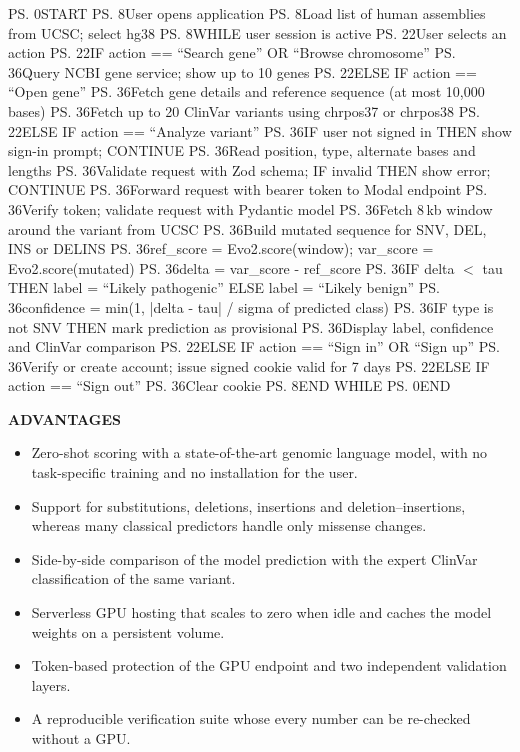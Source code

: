 \ps{0}{START}
\ps{8}{User opens application}
\ps{8}{Load list of human assemblies from UCSC; select hg38}
\ps{8}{WHILE user session is active}
\ps{22}{User selects an action}
\ps{22}{IF action == ``Search gene'' OR ``Browse chromosome''}
\ps{36}{Query NCBI gene service; show up to 10 genes}
\ps{22}{ELSE IF action == ``Open gene''}
\ps{36}{Fetch gene details and reference sequence (at most 10,000 bases)}
\ps{36}{Fetch up to 20 ClinVar variants using chrpos37 or chrpos38}
\ps{22}{ELSE IF action == ``Analyze variant''}
\ps{36}{IF user not signed in THEN show sign-in prompt; CONTINUE}
\ps{36}{Read position, type, alternate bases and lengths}
\ps{36}{Validate request with Zod schema; IF invalid THEN show error; CONTINUE}
\ps{36}{Forward request with bearer token to Modal endpoint}
\ps{36}{Verify token; validate request with Pydantic model}
\ps{36}{Fetch 8\,kb window around the variant from UCSC}
\ps{36}{Build mutated sequence for SNV, DEL, INS or DELINS}
\ps{36}{ref\_score = Evo2.score(window); var\_score = Evo2.score(mutated)}
\ps{36}{delta = var\_score - ref\_score}
\ps{36}{IF delta $<$ tau THEN label = ``Likely pathogenic'' ELSE label = ``Likely benign''}
\ps{36}{confidence = min(1, |delta - tau| / sigma of predicted class)}
\ps{36}{IF type is not SNV THEN mark prediction as provisional}
\ps{36}{Display label, confidence and ClinVar comparison}
\ps{22}{ELSE IF action == ``Sign in'' OR ``Sign up''}
\ps{36}{Verify or create account; issue signed cookie valid for 7 days}
\ps{22}{ELSE IF action == ``Sign out''}
\ps{36}{Clear cookie}
\ps{8}{END WHILE}
\ps{0}{END}

\textbf{ADVANTAGES}
\begin{itemize}
\item Zero-shot scoring with a state-of-the-art genomic language model, with no task-specific training and no installation for the user.
\item Support for substitutions, deletions, insertions and deletion--insertions, whereas many classical predictors handle only missense changes.
\item Side-by-side comparison of the model prediction with the expert ClinVar classification of the same variant.
\item Serverless GPU hosting that scales to zero when idle and caches the model weights on a persistent volume.
\item Token-based protection of the GPU endpoint and two independent validation layers.
\item A reproducible verification suite whose every number can be re-checked without a GPU.
\end{itemize}

